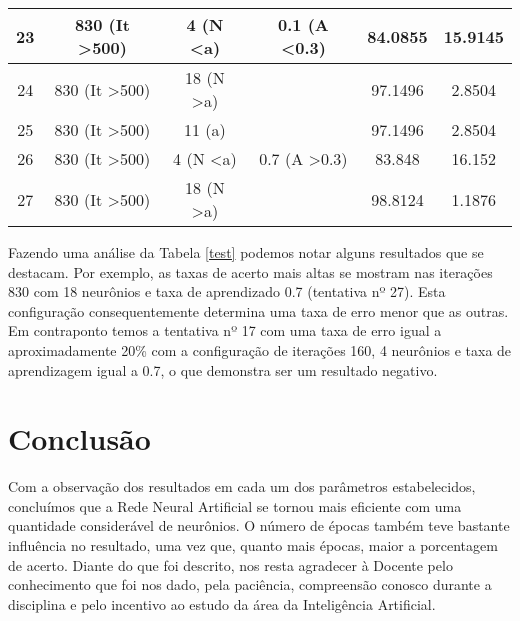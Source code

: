 \documentclass[
	article,			%
	11pt,				%
	oneside,			%
	a4paper,			%
	english,			%
	brazil,				%
	sumario=tradicional
	]{abntex2}
\begin{document}
\begin{table}[h]
\begin{tabular}{|c|c|c|c|c|c|}
		23 & 830 (It \textgreater 500) & 4 (N \textless a)     & 0.1 (A \textless 0.3)    & 84.0855                    & 15.9145                  \\ \hline
		24 & 830 (It \textgreater 500)                          & 18 (N \textgreater a) &                          & 97.1496                    & 2.8504                   \\ \hline
		25 & 830 (It \textgreater 500)                          & 11 (a)                &                          & 97.1496                    & 2.8504                   \\ \hline
		26 & 830 (It \textgreater 500)                          & 4 (N \textless a)     & 0.7 (A \textgreater 0.3) & 83.848                     & 16.152                   \\ \hline
		27 & 830 (It \textgreater 500)                          & 18 (N \textgreater a) &                          & 98.8124                    & 1.1876                   \\ \hline
	\end{tabular}
\end{table}

Fazendo uma análise da Tabela \ref{test} podemos notar alguns resultados que se destacam. Por exemplo, as taxas de acerto mais altas se mostram nas iterações 830 com 18 neurônios e taxa de aprendizado 0.7 (tentativa nº 27). Esta configuração consequentemente determina uma taxa de erro menor que as outras. Em contraponto temos a tentativa nº 17 com uma taxa de erro igual a aproximadamente 20\% com a configuração de iterações 160, 4 neurônios e taxa de aprendizagem igual a 0.7, o que demonstra ser um resultado negativo.

\section{Conclusão}

Com a observação dos resultados em cada um dos parâmetros estabelecidos, concluímos que a Rede Neural Artificial se tornou mais eficiente com uma quantidade considerável de neurônios. O número de épocas também teve bastante influência no resultado, uma vez que, quanto mais épocas, maior a porcentagem de acerto. Diante do que foi descrito, nos resta agradecer à Docente pelo conhecimento que foi nos dado, pela paciência, compreensão conosco durante a disciplina e pelo incentivo ao estudo da área da Inteligência Artificial.


\end{document}
